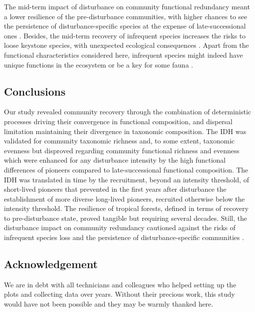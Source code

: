 \documentclass[
  11pt,
  french,
  A4paper,
  extrafontsizes,onecolumn,openright
  ]{memoir}
\begin{document}
The mid-term impact of disturbance on community functional redundancy
meant a lower resilience of the pre-disturbance communities, with higher
chances to see the persistence of disturbance-specific species at the
expense of late-successional ones \autocite{Haddad2008}. Besides, the
mid-term recovery of infrequent species increases the risks to loose
keystone species, with unexpected ecological consequences
\autocites{Jones1994}{Chazdon2003a}{Diaz2005}. Apart from the functional
characteristics considered here, infrequent species might indeed have
unique functions in the ecosystem or be a key for some fauna
\autocite{Schleuning2016}.

\subsection{Conclusions}\label{conclusions}

Our study revealed community recovery through the combination of
deterministic processes driving their convergence in functional
composition, and dispersal limitation maintaining their divergence in
taxonomic composition. The IDH was validated for community taxonomic
richness and, to some extent, taxonomic evenness but disproved regarding
community functional richness and evenness which were enhanced for any
disturbance intensity by the high functional differences of pioneers
compared to late-successional functional composition. The IDH was
translated in time by the recruitment, beyond an intensity threshold, of
short-lived pioneers that prevented in the first years after disturbance
the establishment of more diverse long-lived pioneers, recruited
otherwise below the intensity threshold. The resilience of tropical
forests, defined in terms of recovery to pre-disturbance state, proved
tangible but requiring several decades. Still, the disturbance impact on
community redundancy cautioned against the risks of infrequent species
loss and the persistence of disturbance-specific communities
\autocite{Herault2018}.

\subsection{Acknowledgement}\label{acknowledgement}

We are in debt with all technicians and colleagues who helped setting up
the plots and collecting data over years. Without their precious work,
this study would have not been possible and they may be warmly thanked
here.
\end{document}
